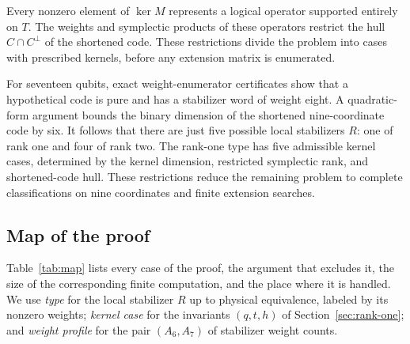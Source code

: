 Every nonzero element of \(\ker M\) represents a logical operator
supported entirely on \(T\). The weights and symplectic products of
these operators restrict the hull \(C\cap C^\perp\) of the shortened
code. These restrictions divide the problem into cases with prescribed
kernels, before any extension matrix is enumerated.

For seventeen qubits, exact weight-enumerator certificates show that a
hypothetical code is pure and has a stabilizer word of weight eight.
A quadratic-form argument bounds the binary dimension of the shortened
nine-coordinate code by six. It follows that there are just five
possible local stabilizers \(R\): one of rank one and four of rank two.
The rank-one type has five admissible kernel cases, determined by the
kernel dimension, restricted symplectic rank, and shortened-code hull.
These restrictions reduce the remaining problem to complete
classifications on nine coordinates and finite extension searches.

\subsection{Map of the proof}\label{sec:map}

Table~\ref{tab:map} lists every case of the proof, the argument that
excludes it, the size of the corresponding finite computation, and the
place where it is handled. We use \emph{type} for the local stabilizer
\(R\) up to physical equivalence, labeled by its nonzero weights;
\emph{kernel case} for the invariants \((q,t,h)\) of
Section~\ref{sec:rank-one}; and \emph{weight profile} for the pair
\((A_6,A_7)\) of stabilizer weight counts.

